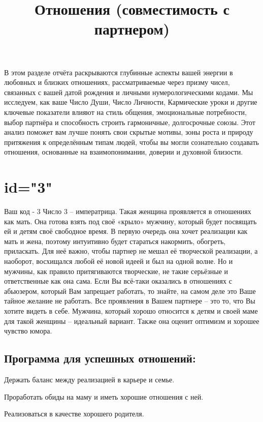 \title{Отношения (совместимость с партнером)}
\description
В этом разделе отчёта раскрываются глубинные аспекты вашей энергии 
в любовных и близких отношениях, рассматриваемые через призму чисел, 
связанных с вашей датой рождения и личными нумерологическими кодами. 
Мы исследуем, как ваше Число Души, Число Личности, Кармические уроки 
и другие ключевые показатели влияют на стиль общения, эмоциональные 
потребности, выбор партнёра и способность строить гармоничные, 
долгосрочные союзы. Этот анализ поможет вам лучше понять свои 
скрытые мотивы, зоны роста и природу притяжения к определённым 
типам людей, чтобы вы могли сознательно создавать отношения, 
основанные на взаимопонимании, доверии и духовной близости.
\enddescription

\section{id="3"}{Ваш код - 3}
Число 3 – императрица. Такая женщина проявляется в отношениях как мать. 
Она готова взять под своё «крыло» мужчину, который будет посвящать ей 
и детям своё свободное время. В первую очередь она хочет реализации 
как мать и жена, поэтому интуитивно будет стараться накормить, обогреть, 
приласкать. Для неё важно, чтобы партнер не мешал её творческой 
реализации, а наоборот, восхищался любой её новой идеей и был на одной 
волне. Но и мужчины, как правило притягиваются творческие, не такие 
серьёзные и ответственные как она сама. Если Вы всё-таки оказались в 
отношениях с абьюзером, который Вам запрещает работать, то знайте, на 
самом деле это Ваше тайное желание не работать. Все проявления в Вашем 
партнере – это то, что Вы хотите видеть в себе. Мужчина, который хорошо 
относится к детям и своей маме для такой женщины – идеальный вариант. 
Также она оценит оптимизм и хорошее чувство юмора.
\subsection{Программа для успешных отношений:}
\item Держать баланс между реализацией в карьере и семье.
\item Проработать обиды на маму и иметь хорошие отношения с ней.
\item Реализоваться в качестве хорошего родителя.
\endsubsection
\endsection


